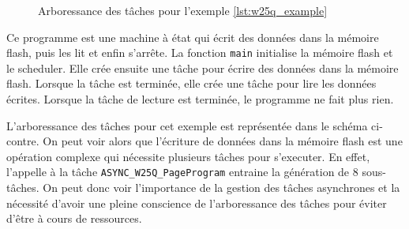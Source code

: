 \begin{minipage}{0.95\textwidth}
\begin{wrapfigure}{L}{0.45\textwidth}
\vspace{-0.8cm}
\caption{Arboressance des tâches pour l'exemple \ref{lst:w25q_example}}
\end{wrapfigure}

Ce programme est une machine à état qui écrit des données dans la mémoire flash,
puis les lit et enfin s'arrête. La fonction \texttt{main} initialise la mémoire
flash et le scheduler. Elle crée ensuite une tâche pour écrire des données dans la
mémoire flash. Lorsque la tâche est terminée, elle crée une tâche pour lire les
données écrites. Lorsque la tâche de lecture est terminée, le programme ne fait
plus rien.

\vspace{0.5cm}

L'arboressance des tâches pour cet exemple est représentée dans le schéma ci-contre.
On peut voir alors que l'écriture de données dans la mémoire flash est une opération
complexe qui nécessite plusieurs tâches pour s'executer. En effet, l'appelle
à la tâche \texttt{ASYNC\_W25Q\_PageProgram} entraine la génération de 8 sous-tâches.
On peut donc voir l'importance de la gestion des tâches asynchrones et la nécessité
d'avoir une pleine conscience de l'arboressance des tâches pour éviter d'être à cours
de ressources.

\end{minipage}
